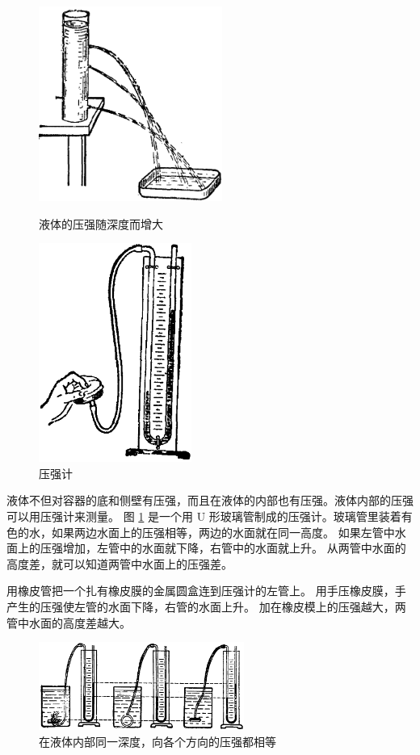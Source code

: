 \begin{figure}[htbp]
    \centering
    \begin{minipage}{7cm}
    \centering
    \includegraphics[width=6cm]{../pic/czwl1-ch5-17}
    \caption{液体的压强随深度而增大}\label{fig:5-17}
    \end{minipage}
    \qquad
    \begin{minipage}{7cm}
    \centering
    \includegraphics[width=5cm]{../pic/czwl1-ch5-18}
    \caption{压强计}\label{fig:5-18}
    \end{minipage}
\end{figure}

液体不但对容器的底和侧壁有压强，而且在液体的内部也有压强。液体内部的压强可以用压强计来测量。
图 \ref{fig:5-18} 是一个用 U 形玻璃管制成的压强计。玻璃管里装着有色的水，如果两边水面上的压强相等，两边的水面就在同一高度。
如果左管中水面上的压强增加，左管中的水面就下降，右管中的水面就上升。
从两管中水面的高度差，就可以知道两管中水面上的压强差。

用橡皮管把一个扎有橡皮膜的金属圆盒连到压强计的左管上。
用手压橡皮膜，手产生的压强使左管的水面下降，右管的水面上升。
加在橡皮模上的压强越大，两管中水面的高度差越大。

\begin{figure}[htbp]
    \centering
    \includegraphics[width=0.6\textwidth]{../pic/czwl1-ch5-19}
    \caption{在液体内部同一深度，向各个方向的压强都相等}\label{fig:5-19}
\end{figure}

